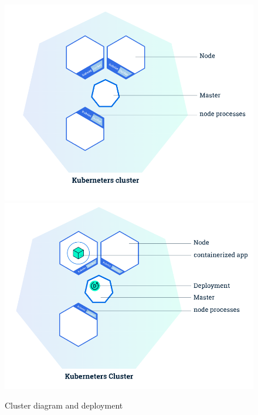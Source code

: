 \documentclass{article}
\begin{document}
\begin{figure}[H]
\includegraphics[scale=.35]{figures/kub_cluster.png}
\includegraphics[scale=.35]{figures/kub_dep.png}
\caption{Cluster diagram and deployment \cite{kubboot}}
\label{fig:aks_node0}
\end{figure}
\end{document}
